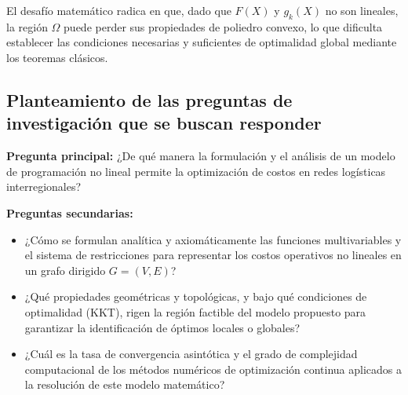 El desafío matemático radica en que, dado que $F(X)$ y $g_k(X)$ no son lineales, la región $\Omega$ puede perder sus propiedades de poliedro convexo, lo que dificulta establecer las condiciones necesarias y suficientes de optimalidad global mediante los teoremas clásicos.

\subsection{Planteamiento de las preguntas de investigación que se buscan responder}
\textbf{Pregunta principal:}
¿De qué manera la formulación y el análisis de un modelo de programación no lineal permite la optimización de costos en redes logísticas interregionales?

\textbf{Preguntas secundarias:}
\begin{itemize}
    \item ¿Cómo se formulan analítica y axiomáticamente las funciones multivariables y el sistema de restricciones para representar los costos operativos no lineales en un grafo dirigido $G=(V,E)$?
    \item ¿Qué propiedades geométricas y topológicas, y bajo qué condiciones de optimalidad (KKT), rigen la región factible del modelo propuesto para garantizar la identificación de óptimos locales o globales?
    \item ¿Cuál es la tasa de convergencia asintótica y el grado de complejidad computacional de los métodos numéricos de optimización continua aplicados a la resolución de este modelo matemático?
\end{itemize}

